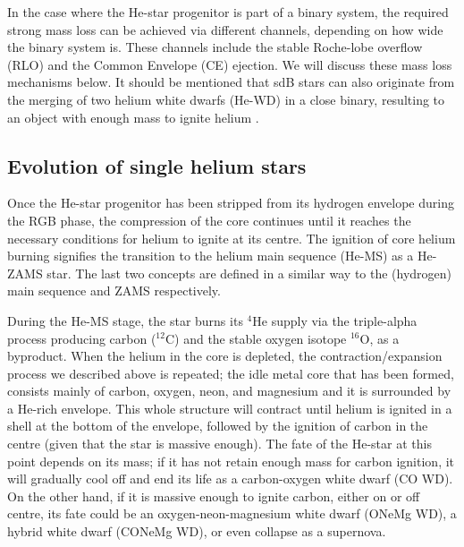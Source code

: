 \documentclass[../../main/thesis_msc.tex]{subfiles}
\begin{document}
				In the case where the He-star progenitor is part of a binary system, the required strong mass loss can be achieved via different channels, depending on how wide the binary system is. These channels include the stable Roche-lobe overflow (RLO) and the Common Envelope (CE) ejection. We will discuss these mass loss mechanisms below.
				It should be mentioned that sdB stars can also originate from the merging of two helium white dwarfs (He-WD) in a close binary, resulting to an object with enough mass to ignite helium \citep{Han2002}.
				
				
			
			\subsection{Evolution of single helium stars}
			
				Once the He-star progenitor has been stripped from its hydrogen envelope during the RGB phase, the compression of the core continues until it reaches the necessary conditions for helium to ignite at its centre. The ignition of core helium burning signifies the transition to the helium main sequence (He-MS) as a He-ZAMS star. The last two concepts are defined in a similar way to the (hydrogen) main sequence and ZAMS respectively.
				
				During the He-MS stage, the star burns its $^4$He supply via the triple-alpha process producing carbon ($^{12}$C) and the stable oxygen isotope $^{16}$O, as a byproduct. When the helium in the core is depleted, the contraction/expansion process we described above is repeated; the idle metal core that has been formed, consists mainly of carbon, oxygen, neon, and magnesium and it is surrounded by a He-rich envelope. This whole structure will contract until helium is ignited in a shell at the bottom of the envelope, followed by the ignition of carbon in the centre (given that the star is massive enough). The fate of the He-star at this point depends on its mass; if it has not retain enough mass for carbon ignition, it will gradually cool off and end its life as a carbon-oxygen white dwarf (CO WD). On the other hand, if it is massive enough to ignite carbon, either on or off centre, its fate could be an oxygen-neon-magnesium white dwarf (ONeMg WD), a hybrid white dwarf (CONeMg WD), or even collapse as a supernova.
				
\end{document}
